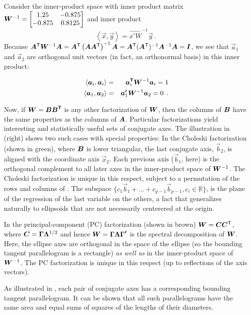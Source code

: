 Consider the inner-product space with inner product matrix 	
$\bm{W}^{-1}=\left[ \begin{matrix}	
1.25 & -0.875 \\	
-0.875 & 0.8125 \\	
\end{matrix} \right]
$ and inner product	
\begin{equation*}
\left\langle \vec{x},\vec{y} \right\rangle =\vec{{x}'W}^{-1}\vec{y} \period
\end{equation*} 	
Because	
$\bm{A}^\mathsf{T} \bm{W}^{-1}\bm{A}
=\bm{A}^\mathsf{T}\left( \bm{A}\bm{A}^\mathsf{T} \right)^{-1}\bm{A}
=\bm{A}^\mathsf{T}(\bm{A}^\mathsf{T})^{-1}\bm{A}^{-1}\bm{A}
=\bm{I}
$,
we see that
$\vec{a}_{1}$
and	
$\vec{a}_{2}$	
are orthogonal unit vectors (in fact, an orthonormal basis) in this inner product:	

\begin{eqnarray*}
\left\langle \vec{a}_{i},\vec{a}_{i} \right\rangle & = & \vec{{a}\trans}_{i}\mat{W}^{-1}\vec{a}_{i}=1	 \\
%	
\left\langle \vec{a}_{1},\vec{a}_{2} \right\rangle & = &\vec{{a}'}_{1}\mat{W}^{-1}\vec{a}_{2}=0 \period
\end{eqnarray*}


Now, if $\bm{W}=\bm{B{B}^\mathsf{T}}$ is any other factorization of
$\bm{W}$,
then the columns of
$\bm{B}$
have the same properties as the columns of
$\bm{A}$.
Particular factorizations yield interesting and statistically useful sets of conjugate axes.
The illustration in  (right) shows two such cases with special properties:
In the Choleski factorization (shown in green), where
$\bm{B}$ is lower triangular, the last conjugate axis, $\vec{b}_2$, is aligned with the coordinate
axis $\vec{x}_2$.  Each previous axis ($\vec{b}_1$, here) is the orthogonal complement to
all later axes in the  inner-product space of
$\bm{W}^{-1}$.  
The Choleski factorization is unique in this respect, subject to a
permutation of the rows and columns of . 
The subspace $\{ c_1 \vec{b}_1 + ... + c_{p-1} \vec{b}_{p-1}  , c_i \in \mathbb{R}\}$, is the plane of the regression of the last variable on the others, a fact that generalizes naturally to ellipsoids that are not necessarily centerered at the origin.  %

In the principal-component (PC) factorization (shown in brown) $\bm{W}=\bm{C} \bm{C}^\mathsf{T}$, where
$\bm{C}=\bm{\Gamma \Lambda }^{1/2}$
and hence
$\bm{W}=\bm{\Gamma \Lambda {\Gamma }'}$
is the spectral decomposition of
$\bm{W}$. Here, the ellipse axes are orthogonal in the space of the ellipse
(so the bounding tangent parallelogram is a rectangle) \emph{as well as} in the inner-product space of
$\bm{W}^{-1}$. The PC factorization is unique in this respect (up to reflections of the axis vectors).

As illustrated in , each pair of conjugate axes has a corresponding bounding tangent
parallelogram. It can be shown that all such parallelograms have the same area
and equal sums of squares of the lengths of their diameters.
